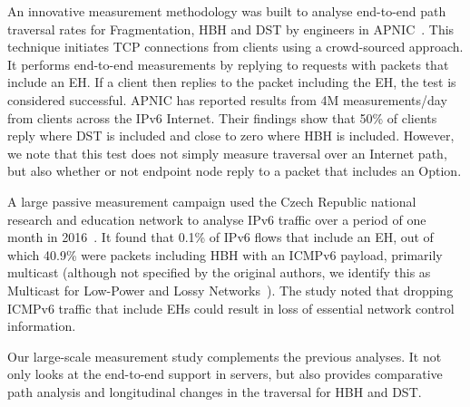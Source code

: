 \documentclass[conference]{IEEEtran}
\begin{document}
An innovative measurement methodology was built to analyse end-to-end path traversal
rates for Fragmentation, HBH and DST by engineers in APNIC~\cite{apnic}.  This technique initiates TCP connections from clients using a crowd-sourced approach. It performs 
end-to-end measurements by replying to requests with packets that include an EH. If a client then replies to the packet including the EH, the test is considered successful.  
APNIC has reported results from 4M measurements/day from clients across the IPv6 Internet. 
Their findings show that 50\%  of clients reply where DST is included and close to zero where HBH is included.
However, we note that this test does not simply measure traversal over an Internet path, but also whether or not endpoint node reply to a packet that includes an Option. 


A large passive measurement campaign used the Czech Republic national
research and education network to analyse IPv6 traffic over a period of one month in
2016~\cite{passive-threats}. It found that 0.1\% of IPv6 flows
that include an EH, out of which 40.9\% were packets including HBH with an ICMPv6
payload, primarily multicast (although not specified by the original authors,
we identify this as Multicast for Low-Power and Lossy Networks~\cite{RFC7731}).
The study noted that dropping ICMPv6 traffic that include EHs could result in
loss of essential network control information. 


Our large-scale measurement study complements the previous analyses. It not only
looks at the end-to-end support in servers, but also provides comparative path
analysis and longitudinal changes in the traversal for HBH and DST.
\end{document}

